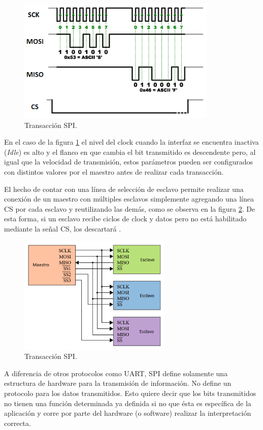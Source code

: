 \begin{figure}[H]
\centering
\includegraphics[width=0.85\textwidth]{./Figures/SPItrans.png}
\caption{Transacción SPI.}
\label{fig:transSPI}
\end{figure}

En el caso de la figura \ref{fig:transSPI} el nivel del clock cuando la interfaz se encuentra inactiva (\textit{Idle}) es alto y el flanco en que cambia el bit transmitido es descendente pero, al igual que la velocidad de transmisión, estos parámetros pueden ser configurados con distintos valores por el maestro antes de realizar cada transacción.

El hecho de contar con una línea de selección de esclavo permite realizar una conexión de un maestro con múltiples esclavos simplemente agregando una línea CS por cada esclavo y reutilizando las demás, como se observa en la figura \ref{fig:multiSlave}. De esta forma, si un esclavo recibe ciclos de clock y datos pero no está habilitado mediante la señal CS, los descartará \citep{WEBSITE:SPI}.

\begin{figure}[H]
\centering
\includegraphics[width=0.65\textwidth]{./Figures/multiSlave.png}
\caption{Transacción SPI.}
\label{fig:multiSlave}
\end{figure}

A diferencia de otros protocolos como UART, SPI define solamente una estructura de hardware para la transmisión de información. No define un protocolo para los datos transmitidos. Esto quiere decir que los bits transmitidos no tienen una función determinada ya definida si no que ésta es específica de la aplicación y corre por parte del hardware (o software) realizar la interpretación correcta.
